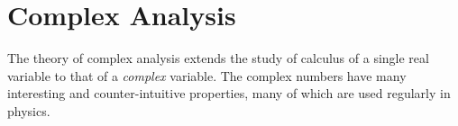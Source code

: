 \chapter{Complex Analysis}
    The theory of complex analysis extends the study of calculus of a
    single real variable to that of a \textit{complex} variable. The
    complex numbers have many interesting and counter-intuitive properties,
    many of which are used regularly in physics.
